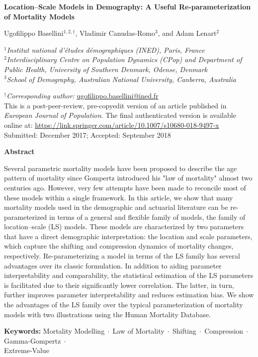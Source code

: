 \documentclass[Thesis]{subfiles}
\begin{document}
\thispagestyle{empty}
{\centering
{\Large\bfseries Location--Scale Models in Demography: A Useful Re-parameterization of Mortality Models \par}
\vspace{0.5cm}
{\large Ugofilippo Basellini$^{1,2,\dagger}$, Vladimir Canudas-Romo$^{3}$, and Adam Lenart$^{2}$  \par}
\singlespacing
{\normalsize $^{1}$\itshape Institut national d'\'{e}tudes d\'emographiques (INED), Paris, France\\[2mm]}
{\normalsize  $^{2}$\itshape Interdisciplinary Centre on Population Dynamics (CPop) and Department of Public Health, University of Southern Denmark, Odense, Denmark\\[2mm]}
{\normalsize $^{3}$\itshape School of Demography, Australian National University, Canberra, Australia\\[2mm]}
{\normalsize $^{\dagger}${\itshape Corresponding author:} \url{ugofilippo.basellini@ined.fr}\\
\vspace{0.5cm} This is a post-peer-review, pre-copyedit version of an article published in \\ \textit{European Journal of Population}. The final authenticated version is available online at: \url{https://link.springer.com/article/10.1007/s10680-018-9497-x} \\  
\vspace{0.5cm} Submitted: December 2017; Accepted: September 2018	 \par}
\vspace{1.0cm}
{\bfseries Abstract \\[5mm]}
\onehalfspacing
{\normalsize \justify Several parametric mortality models have been proposed to describe the age pattern of mortality since Gompertz introduced his "law of mortality" almost two centuries ago. However, very few attempts have been made to reconcile most of these models within a single framework. In this article, we show that many mortality models used in the demographic and actuarial literature can be re-parameterized in terms of a general and flexible family of models, the family of location--scale (LS) models. These models are characterized by two parameters that have a direct demographic interpretation: the location and scale parameters, which capture the shifting and compression dynamics of mortality changes, respectively. Re-parameterizing a model in terms of the LS family has several advantages over its classic formulation. In addition to aiding parameter interpretability and comparability, the statistical estimation of the LS parameters is facilitated due to their significantly lower correlation. The latter, in turn, further improves parameter interpretability and reduces estimation bias. We show the advantages of the LS family over the typical parameterization of mortality models with two illustrations using the Human Mortality Database. \par 
\vspace{0.5cm}	
\noindent \textbf{Keywords:} Mortality Modelling$\;\cdot\;$Law of Mortality$\;\cdot\;$Shifting$\;\cdot\;$Compression$\;\cdot\;$Gamma-Gompertz$\;\cdot\;$\\Extreme-Value}
}
\end{document}
